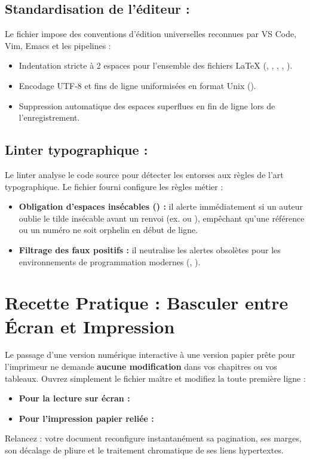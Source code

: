 \subsection{Standardisation de l'éditeur : }
Le fichier  impose des conventions d'édition universelles reconnues par VS Code, Vim, Emacs et les pipelines  :
\begin{itemize}
  \item Indentation stricte à 2 espaces pour l'ensemble des fichiers \LaTeX{} (, , , , ).
  \item Encodage UTF-8 et fins de ligne uniformisées en format Unix ().
  \item Suppression automatique des espaces superflues en fin de ligne lors de l'enregistrement.
\end{itemize}

\subsection{Linter typographique : }
Le linter  analyse le code source pour détecter les entorses aux règles de l'art typographique.
Le fichier  fourni configure les règles métier :
\begin{itemize}
  \item \textbf{Obligation d'espaces insécables (\code{\textasciitilde}) :}
  il alerte immédiatement si un auteur oublie le tilde insécable avant un renvoi
  (ex.  ou ),
  empêchant qu'une référence ou un numéro ne soit orphelin en début de ligne.
  \item \textbf{Filtrage des faux positifs :}
  il neutralise les alertes obsolètes pour les environnements de programmation modernes (, ).
\end{itemize}

\section{Recette Pratique : Basculer entre Écran et Impression}
\label{sec:recette-bascule}

Le passage d'une version numérique interactive à une version papier prête pour l'imprimeur
ne demande \textbf{aucune modification} dans vos chapitres ou vos tableaux.
Ouvrez simplement le fichier maître  et modifiez la toute première ligne :
\begin{itemize}[nosep]
  \item \textbf{Pour la lecture sur écran :} 
  \item \textbf{Pour l'impression papier reliée :} 
\end{itemize}
\vspace{4pt}
Relancez  : votre document reconfigure instantanément sa pagination, ses marges,
son décalage de pliure  et le traitement chromatique de ses liens hypertextes.
